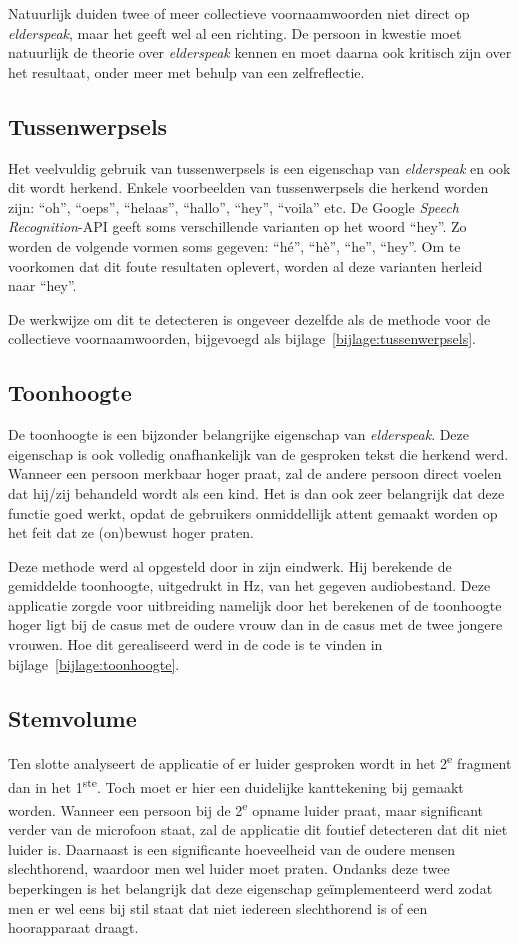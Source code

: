 Natuurlijk duiden twee of meer collectieve voornaamwoorden niet direct op \textit{elderspeak}, maar het geeft wel al een richting. De persoon in kwestie moet natuurlijk de theorie over \textit{elderspeak} kennen en moet daarna ook kritisch zijn over het resultaat, onder meer met behulp van een zelfreflectie.

\subsection{Tussenwerpsels}
Het veelvuldig gebruik van tussenwerpsels is een eigenschap van \textit{elderspeak} en ook dit wordt herkend. Enkele voorbeelden van tussenwerpsels die herkend worden zijn: ``oh'', ``oeps'', ``helaas'', ``hallo'', ``hey'', ``voila'' etc. De Google \textit{Speech Recognition}-API geeft soms verschillende varianten op het woord ``hey''. Zo worden de volgende vormen soms gegeven: ``hé'', ``hè'', ``he'', ``hey''. Om te voorkomen dat dit foute resultaten oplevert, worden al deze varianten herleid naar ``hey''.

De werkwijze om dit te detecteren is ongeveer dezelfde als de methode voor de collectieve voornaamwoorden, bijgevoegd als bijlage~\ref{bijlage:tussenwerpsels}.

\subsection{Toonhoogte}
De toonhoogte is een bijzonder belangrijke eigenschap van \textit{elderspeak}. Deze eigenschap is ook volledig onafhankelijk van de gesproken tekst die herkend werd. Wanneer een persoon merkbaar hoger praat, zal de andere persoon direct voelen dat hij/zij behandeld wordt als een kind. Het is dan ook zeer belangrijk dat deze functie goed werkt, opdat de gebruikers onmiddellijk attent gemaakt worden op het feit dat ze (on)bewust hoger praten.

Deze methode werd al opgesteld door \textcite{Standaert2021} in zijn eindwerk. Hij berekende de gemiddelde toonhoogte, uitgedrukt in Hz, van het gegeven audiobestand. Deze applicatie zorgde voor uitbreiding namelijk door het berekenen of de toonhoogte hoger ligt bij de casus met de oudere vrouw dan in de casus met de twee jongere vrouwen.
Hoe dit gerealiseerd werd in de code is te vinden in bijlage~\ref{bijlage:toonhoogte}.

\subsection{Stemvolume}
Ten slotte analyseert de applicatie of er luider gesproken wordt in het 2\textsuperscript{e} fragment dan in het 1\textsuperscript{ste}. Toch moet er hier een duidelijke kanttekening bij gemaakt worden. Wanneer een persoon bij de 2\textsuperscript{e} opname luider praat, maar significant verder van de microfoon staat, zal de applicatie dit foutief detecteren  dat dit niet luider is. Daarnaast is een significante hoeveelheid van de oudere mensen slechthorend, waardoor men wel luider moet praten. Ondanks deze twee beperkingen is het belangrijk dat deze eigenschap geïmplementeerd werd zodat men er wel eens bij stil staat dat niet iedereen slechthorend is of een hoorapparaat draagt.

